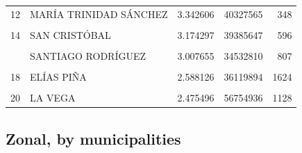 \documentclass[10pt,landscape,a3paper]{article}
\begin{document}
\begin{table}[H]
\begin{tabular}[t]{llrrr}
12 & MARÍA TRINIDAD SÁNCHEZ & 3.342606 & 40327565 & 348\\
\cellcolor{lightgray}{13} & \cellcolor{lightgray}{ESPAILLAT} & \cellcolor{lightgray}{3.308128} & \cellcolor{lightgray}{27851494} & \cellcolor{lightgray}{187}\\
14 & SAN CRISTÓBAL & 3.174297 & 39385647 & 596\\
\cellcolor{lightgray}{15} & \cellcolor{lightgray}{VALVERDE} & \cellcolor{lightgray}{3.067846} & \cellcolor{lightgray}{25239085} & \cellcolor{lightgray}{390}\\
\addlinespace
16 & SANTIAGO RODRÍGUEZ & 3.007655 & 34532810 & 807\\
\cellcolor{lightgray}{17} & \cellcolor{lightgray}{MONTE CRISTI} & \cellcolor{lightgray}{2.931488} & \cellcolor{lightgray}{55185337} & \cellcolor{lightgray}{1123}\\
18 & ELÍAS PIÑA & 2.588126 & 36119894 & 1624\\
\cellcolor{lightgray}{19} & \cellcolor{lightgray}{SANTO DOMINGO} & \cellcolor{lightgray}{2.564897} & \cellcolor{lightgray}{33380362} & \cellcolor{lightgray}{502}\\
20 & LA VEGA & 2.475496 & 56754936 & 1128\\
\bottomrule
\end{tabular}
\end{table}

\hypertarget{zonal-by-municipalities}{%
\subsection{Zonal, by municipalities}\label{zonal-by-municipalities}}
\end{document}
